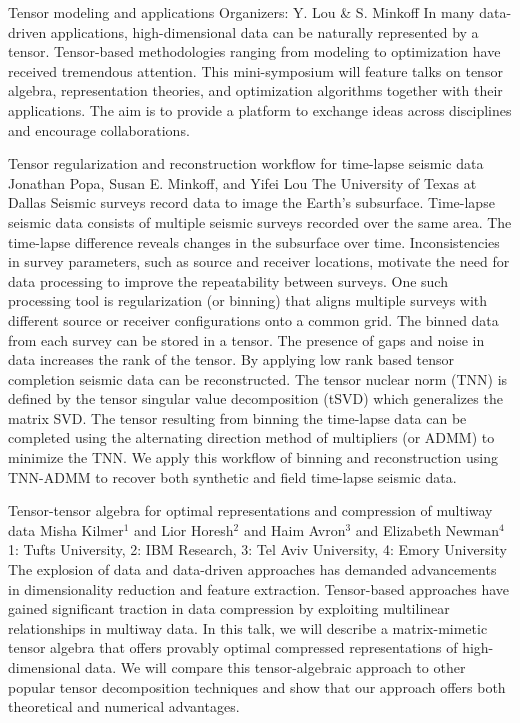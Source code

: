 \label{mini12}

\miniabs
{Tensor modeling and applications}
{Organizers: Y. Lou \& S. Minkoff}
{In many data-driven applications, high-dimensional data can be naturally represented by a tensor. Tensor-based methodologies ranging from modeling to optimization have received tremendous attention.  This mini-symposium will feature talks on tensor algebra, representation theories, and optimization algorithms together with their applications. The aim is to provide a platform to exchange ideas across disciplines and encourage collaborations.}

\begin{addmargin}[2em]{0em}
\vspace{2ex}
\abs
{Tensor regularization and reconstruction workflow for time-lapse seismic data}
{Jonathan Popa, Susan E. Minkoff, and Yifei Lou}
{The University of Texas at Dallas}
{Seismic surveys record data to image the Earth's subsurface. Time-lapse seismic data consists of multiple seismic surveys recorded over the same area. The time-lapse difference reveals changes in the subsurface over time. Inconsistencies in survey parameters, such as source and receiver locations, motivate the need for data processing to improve the repeatability between surveys. One such processing tool is regularization (or binning) that aligns multiple surveys with different source or receiver configurations onto a common grid. The binned data from each survey can be stored in a tensor. The presence of gaps and noise in data increases the rank of the tensor. By applying low rank based tensor completion seismic data can be reconstructed. The tensor nuclear norm (TNN) is defined by the tensor singular value decomposition (tSVD) which generalizes the matrix SVD. The tensor resulting from binning the time-lapse data can be completed using the alternating direction method of multipliers (or ADMM) to minimize the TNN. We apply this workflow of binning and reconstruction using TNN-ADMM to recover both synthetic and field time-lapse seismic data.}


\vspace{1.5ex}
\abs
{Tensor-tensor algebra for optimal representations and compression of multiway data}
{Misha Kilmer$^{1}$ and Lior Horesh$^{2}$ and Haim Avron$^{3}$ and Elizabeth Newman$^{4}$}
{1: Tufts University, 2: IBM Research, 3: Tel Aviv University, 4: Emory University}
{The explosion of data and data-driven approaches has demanded advancements in dimensionality reduction and feature extraction.  Tensor-based approaches have gained significant traction in data compression by exploiting multilinear relationships in multiway data.  In this talk, we will describe a matrix-mimetic tensor algebra that offers provably optimal compressed representations of high-dimensional data.  We will compare this tensor-algebraic approach to other popular tensor decomposition techniques and show that our approach offers both theoretical and numerical advantages.}



\end{addmargin}
